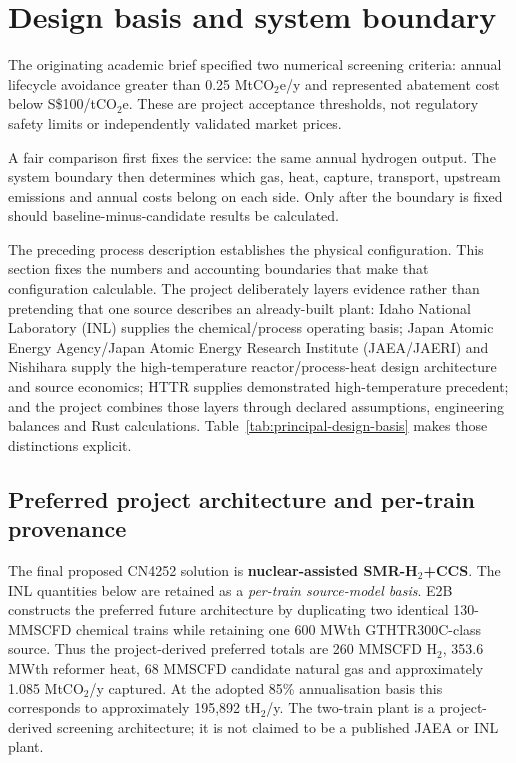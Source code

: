 \section{Design basis and system boundary}\label{sec:design-basis}
The originating academic brief specified two numerical screening criteria: annual lifecycle avoidance greater than 0.25 MtCO$_2$e/y and represented abatement cost below S\$100/tCO$_2$e. These are project acceptance thresholds, not regulatory safety limits or independently validated market prices.


A fair comparison first fixes the service: the same annual hydrogen output. The system boundary then determines which gas, heat, capture, transport, upstream emissions and annual costs belong on each side. Only after the boundary is fixed should baseline-minus-candidate results be calculated.

The preceding process description establishes the physical configuration. This section fixes the numbers and accounting boundaries that make that configuration calculable. The project deliberately layers evidence rather than pretending that one source describes an already-built plant: Idaho National Laboratory (INL) supplies the chemical/process operating basis; Japan Atomic Energy Agency/Japan Atomic Energy Research Institute (JAEA/JAERI) and Nishihara supply the high-temperature reactor/process-heat design architecture and source economics; HTTR supplies demonstrated high-temperature precedent; and the project combines those layers through declared assumptions, engineering balances and Rust calculations. Table~\ref{tab:principal-design-basis} makes those distinctions explicit.

\subsection{Preferred project architecture and per-train provenance}
The final proposed CN4252 solution is \textbf{nuclear-assisted SMR-H$_2$+CCS}. The INL quantities below are retained as a \emph{per-train source-model basis}. E2B constructs the preferred future architecture by duplicating two identical 130-MMSCFD chemical trains while retaining one 600 MWth GTHTR300C-class source. Thus the project-derived preferred totals are 260 MMSCFD H$_2$, 353.6 MWth reformer heat, 68 MMSCFD candidate natural gas and approximately 1.085 MtCO$_2$/y captured. At the adopted 85\% annualisation basis this corresponds to approximately 195,892 tH$_2$/y. The two-train plant is a project-derived screening architecture; it is not claimed to be a published JAEA or INL plant.

